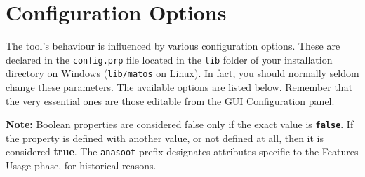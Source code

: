 
\section{Configuration Options}\label{AdvConfigOptions}
The tool's behaviour is influenced by various configuration
options. These are declared in the \texttt{config.prp} file located
in the \texttt{lib} folder of your installation directory on Windows
(\texttt{lib/matos} on Linux). In fact, you should
normally seldom change these parameters. The available options are listed
below. Remember that the very essential ones are those editable
from the GUI Configuration panel.

\noindent \textbf{Note:} Boolean properties are considered false only if the
exact value is \texttt{\textbf{false}}. If the property is defined with another
value, or not defined at all, then it is considered \textbf{true}.
The \texttt{anasoot} prefix designates attributes specific
to the Features Usage phase, for historical reasons.


